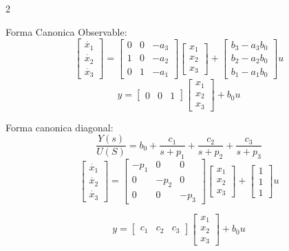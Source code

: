 \documentclass{article}
\begin{document}
\begin{multicols}{2}
\begin{itemform}
    \item Forma Canonica Observable:
    $$
    \begin{bmatrix}
      \dot{x_1} \\
      \dot{x_2} \\
      \dot{x_3 }
    \end{bmatrix}
    = \begin{bmatrix}
      0 & 0 & -a_3 \\
      1 & 0 & -a_2 \\
      0 & 1 & -a_1 
    \end{bmatrix}
    \begin{bmatrix}
      x_1 \\
      x_2 \\
      x_3
    \end{bmatrix}
    + \begin{bmatrix}
      b_3 - a_3b_0 \\
      b_2 - a_2b_0 \\
      b_1 - a_1b_0
    \end{bmatrix} u
    $$
    $$y= \begin{bmatrix}
      0 & 0 & 1
    \end{bmatrix} \begin{bmatrix}
      x_1 \\
      x_2 \\
      x_3
    \end{bmatrix}+b_0 u$$
  \item Forma canonica diagonal:
  $$
  \dfrac{Y(s)}{U(S)}= b_0+ \frac{c_1}{s+p_1}+ \frac{c_2}{s+p_2}+ \frac{c_3}{s+p_3}
  $$
  $$
  \begin{bmatrix}
    \dot{x_1} \\
    \dot{x_2} \\
    \dot{x_3 }
  \end{bmatrix}
  = \begin{bmatrix}
    -p_1 & 0 & 0 \\
    0 & -p_2 & 0 \\
    0 & 0 & -p_3
  \end{bmatrix}
  \begin{bmatrix}
    x_1 \\
    x_2 \\
    x_3
  \end{bmatrix}
  + \begin{bmatrix}
    1 \\
    1 \\
    1
  \end{bmatrix} u
  $$

  $$y= \begin{bmatrix}
    c_1 & c_2 & c_3
  \end{bmatrix} \begin{bmatrix}
    x_1 \\
    x_2 \\
    x_3
  \end{bmatrix}+b_0 u$$
  \end{itemform}
\end{multicols}
\end{document}
